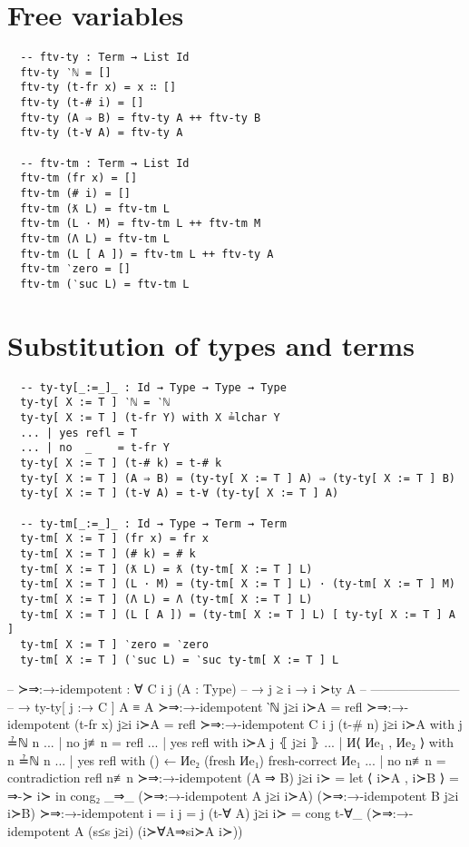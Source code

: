 \documentclass[logo,bsc,singlespacing,parskip,online]{infthesis}
\renewenvironment{code}{\mintedcopy[breaklines,breaksymbolleft=\;]{agda}}{\endmintedcopy}
\begin{document}
\section{Free variables}
\label{appendix:f_free_variables}
\begin{verbatim}
  -- ftv-ty : Term → List Id
  ftv-ty ‵ℕ = []
  ftv-ty (t-fr x) = x ∷ []
  ftv-ty (t-# i) = []
  ftv-ty (A ⇒ B) = ftv-ty A ++ ftv-ty B
  ftv-ty (t-∀ A) = ftv-ty A

  -- ftv-tm : Term → List Id
  ftv-tm (fr x) = []
  ftv-tm (# i) = []
  ftv-tm (ƛ L) = ftv-tm L
  ftv-tm (L · M) = ftv-tm L ++ ftv-tm M
  ftv-tm (Λ L) = ftv-tm L
  ftv-tm (L [ A ]) = ftv-tm L ++ ftv-ty A
  ftv-tm ‵zero = []
  ftv-tm (‵suc L) = ftv-tm L
\end{verbatim}

\section{Substitution of types and terms}
\label{appendix:f_substitution_of_terms}
\begin{verbatim}
  -- ty-ty[_:=_]_ : Id → Type → Type → Type
  ty-ty[ X := T ] ‵ℕ = ‵ℕ
  ty-ty[ X := T ] (t-fr Y) with X ≟lchar Y
  ... | yes refl = T
  ... | no  _    = t-fr Y
  ty-ty[ X := T ] (t-# k) = t-# k
  ty-ty[ X := T ] (A ⇒ B) = (ty-ty[ X := T ] A) ⇒ (ty-ty[ X := T ] B)
  ty-ty[ X := T ] (t-∀ A) = t-∀ (ty-ty[ X := T ] A)

  -- ty-tm[_:=_]_ : Id → Type → Term → Term
  ty-tm[ X := T ] (fr x) = fr x
  ty-tm[ X := T ] (# k) = # k
  ty-tm[ X := T ] (ƛ L) = ƛ (ty-tm[ X := T ] L)
  ty-tm[ X := T ] (L · M) = (ty-tm[ X := T ] L) · (ty-tm[ X := T ] M)
  ty-tm[ X := T ] (Λ L) = Λ (ty-tm[ X := T ] L)
  ty-tm[ X := T ] (L [ A ]) = (ty-tm[ X := T ] L) [ ty-ty[ X := T ] A ]
  ty-tm[ X := T ] ‵zero = ‵zero
  ty-tm[ X := T ] (‵suc L) = ‵suc ty-tm[ X := T ] L
\end{verbatim}

\begin{code}
  -- ≻⇒:→-idempotent : ∀ {C i j} (A : Type)
  --   → j ≥ i       → i ≻ty A
  --     ---------------------
  --   → ty-ty[ j :→ C ] A ≡ A
  ≻⇒:→-idempotent ‵ℕ j≥i i≻A = refl
  ≻⇒:→-idempotent (t-fr x) j≥i i≻A = refl
  ≻⇒:→-idempotent {C} {i} {j} (t-# n) j≥i i≻A with j ≟ℕ n
  ... | no  j≢n  = refl
  ... | yes refl with i≻A j ⦃ j≥i ⦄
  ...   | И⟨ Иe₁ , Иe₂ ⟩ with n ≟ℕ n
  ...     | yes refl with () ← Иe₂ (fresh Иe₁) {fresh-correct Иe₁}
  ...     | no  n≢n  = contradiction refl n≢n
  ≻⇒:→-idempotent (A ⇒ B) j≥i i≻ = let ⟨ i≻A , i≻B ⟩ = ⇒-≻ i≻
    in cong₂ _⇒_ (≻⇒:→-idempotent A j≥i i≻A) (≻⇒:→-idempotent B j≥i i≻B)
  ≻⇒:→-idempotent {i = i} {j = j} (t-∀ A) j≥i i≻ = cong t-∀_
    (≻⇒:→-idempotent A (s≤s j≥i) (i≻∀A⇒si≻A i≻))
\end{code}
\end{document}
